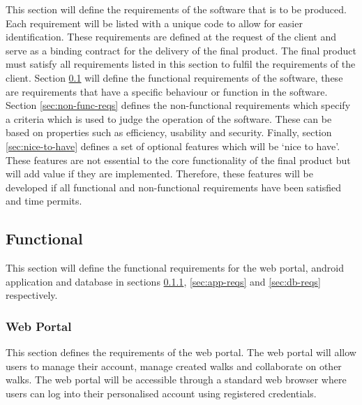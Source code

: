 \documentclass[11pt,a4paper]{article}
\begin{document}
This section will define the requirements of the software that is to be produced.
Each requirement will be listed with a unique code to allow for easier identification.
These requirements are defined at the request of the client and serve as a binding contract for the delivery of the final product.
The final product must satisfy all requirements listed in this section to fulfil the requirements of the client.
Section \ref{sec:func-reqs} will define the functional requirements of the software, these are requirements that have a specific behaviour or function in the software. 
Section \ref{sec:non-func-reqs} defines the non-functional requirements which specify a criteria which is used to judge the operation of the software.
These can be based on properties such as efficiency, usability and security.
Finally, section \ref{sec:nice-to-have} defines a set of optional features which will be `nice to have'.
These features are not essential to the core functionality of the final product but will add value if they are implemented.
Therefore, these features will be developed if all functional and non-functional requirements have been satisfied and time permits.

\subsection{Functional}
\label{sec:func-reqs}

This section will define the functional requirements for the web portal, android application and database in sections \ref{sec:req-reg-login}, \ref{sec:app-reqs} and \ref{sec:db-reqs} respectively.

\subsubsection{Web Portal}
\label{sec:req-reg-login}

This section defines the requirements of the web portal. 
The web portal will allow users to manage their account, manage created walks and collaborate on other walks.
The web portal will be accessible through a standard web browser where users can log into their personalised account using registered credentials.
\end{document}
